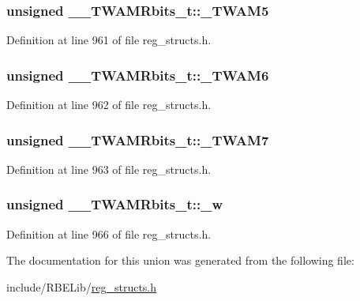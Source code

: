 \hypertarget{union_____t_w_a_m_rbits__t_acfbe4b6b56eaa55b381aaf817406965e}{
\subsubsection[{\+\_\+\+T\+W\+A\+M5}]{\setlength{\rightskip}{0pt plus 5cm}unsigned \+\_\+\+\_\+\+T\+W\+A\+M\+Rbits\+\_\+t\+::\+\_\+\+T\+W\+A\+M5}}\label{union_____t_w_a_m_rbits__t_acfbe4b6b56eaa55b381aaf817406965e}


Definition at line 961 of file reg\+\_\+structs.\+h.

\hypertarget{union_____t_w_a_m_rbits__t_ac7b8164dafdc0140a59c6c4e2aa717ab}{
\subsubsection[{\+\_\+\+T\+W\+A\+M6}]{\setlength{\rightskip}{0pt plus 5cm}unsigned \+\_\+\+\_\+\+T\+W\+A\+M\+Rbits\+\_\+t\+::\+\_\+\+T\+W\+A\+M6}}\label{union_____t_w_a_m_rbits__t_ac7b8164dafdc0140a59c6c4e2aa717ab}


Definition at line 962 of file reg\+\_\+structs.\+h.

\hypertarget{union_____t_w_a_m_rbits__t_a5f49b853c799bcc21768ab54ca1217c5}{
\subsubsection[{\+\_\+\+T\+W\+A\+M7}]{\setlength{\rightskip}{0pt plus 5cm}unsigned \+\_\+\+\_\+\+T\+W\+A\+M\+Rbits\+\_\+t\+::\+\_\+\+T\+W\+A\+M7}}\label{union_____t_w_a_m_rbits__t_a5f49b853c799bcc21768ab54ca1217c5}


Definition at line 963 of file reg\+\_\+structs.\+h.

\hypertarget{union_____t_w_a_m_rbits__t_a8b46c36d09399d623611733addb85dc8}{
\subsubsection[{\+\_\+w}]{\setlength{\rightskip}{0pt plus 5cm}unsigned \+\_\+\+\_\+\+T\+W\+A\+M\+Rbits\+\_\+t\+::\+\_\+w}}\label{union_____t_w_a_m_rbits__t_a8b46c36d09399d623611733addb85dc8}


Definition at line 966 of file reg\+\_\+structs.\+h.



The documentation for this union was generated from the following file\+:\begin{DoxyCompactItemize}
\item 
include/\+R\+B\+E\+Lib/\hyperlink{reg__structs_8h}{reg\+\_\+structs.\+h}\end{DoxyCompactItemize}
